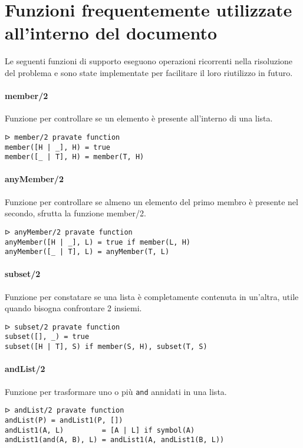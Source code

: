 \documentclass[12pt,twoside]{report}
\begin{document}
\section*{Funzioni frequentemente utilizzate all'interno del documento}

Le seguenti funzioni di supporto eseguono operazioni ricorrenti nella risoluzione del problema e sono state implementate per facilitare il loro riutilizzo in futuro.
\paragraph{member/2}
Funzione per controllare se un elemento è presente all'interno di una lista.
\begin{lstlisting}
ᐅ member/2 pravate function 
member([H | _], H) = true
member([_ | T], H) = member(T, H)
\end{lstlisting}

\paragraph{anyMember/2}
Funzione per controllare se almeno un elemento del primo membro è presente nel secondo, sfrutta la funzione member/2.
\begin{lstlisting}
ᐅ anyMember/2 pravate function
anyMember([H | _], L) = true if member(L, H)
anyMember([_ | T], L) = anyMember(T, L)
\end{lstlisting}

\paragraph{subset/2}
Funzione per constatare se una lista è completamente contenuta in un'altra, utile quando bisogna confrontare 2 insiemi.
\begin{lstlisting}
ᐅ subset/2 pravate function
subset([], _) = true
subset([H | T], S) if member(S, H), subset(T, S)
\end{lstlisting}

\paragraph{andList/2}
Funzione per trasformare uno o più \texttt{and} annidati in una lista.
\begin{lstlisting}
ᐅ andList/2 pravate function
andList(P) = andList1(P, [])
andList1(A, L)         = [A | L] if symbol(A)
andList1(and(A, B), L) = andList1(A, andList1(B, L))
\end{lstlisting}
\end{document}
